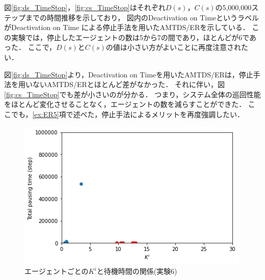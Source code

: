\documentclass[12pt,a4j,twoside]{jarticle}
\begin{document}
  図\ref{fig:ds_TimeStop}，\ref{fig:cs_TimeStop}はそれぞれ$D(s)$，$C(s)$の5,000,000ステップまでの時間推移を示しており，
  図内のDeactivation on TimeというラベルがDeactivation on Time による停止手法を用いたAMTDS/ERを示している．
  この実験では，停止したエージェントの数は5から7の間であり，ほとんどが6であった．
  ここで，$D(s)$と$C(s)$の値は小さい方がよいことに再度注意されたい．
  \par

  図\ref{fig:ds_TimeStop}より，Deactivation on Timeを用いたAMTDS/ERは，停止手法を用いないAMTDS/ERとほとんど差がなかった．
  それに伴い，図\ref{fig:cs_TimeStop}でも差が小さいのが分かる．
  つまり，システム全体の巡回性能をほとんど変化させることなく，エージェントの数を減らすことができた．
  ここでも，\ref{ex:ER5}項で述べた，停止手法によるメリットを再度強調したい．


  \begin{figure}
    \centering
    \includegraphics[width=0.8\hsize]{figures/CorrectionScatter_Office_TimeStop.png}
    \caption{エージェントごとの$K^i$と待機時間の関係(実験6)}
    \label{fig:cscatter_TimeStop_Office}
  \end{figure}
\end{document}
